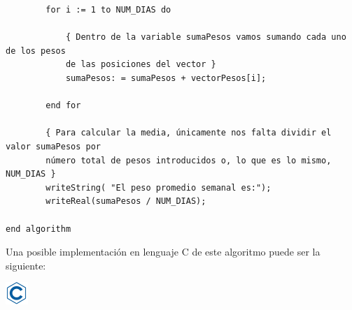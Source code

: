 \documentclass[
]{book}
\begin{document}
\begin{verbatim}
        for i := 1 to NUM_DIAS do

            { Dentro de la variable sumaPesos vamos sumando cada uno de los pesos
            de las posiciones del vector }
            sumaPesos: = sumaPesos + vectorPesos[i];
       
        end for

        { Para calcular la media, únicamente nos falta dividir el valor sumaPesos por
        número total de pesos introducidos o, lo que es lo mismo, NUM_DIAS }
        writeString( "El peso promedio semanal es:");
        writeReal(sumaPesos / NUM_DIAS);

end algorithm
\end{verbatim}

Una posible implementación en lenguaje C de este algoritmo puede ser la siguiente:

\includegraphics{./img/c.png}
\end{document}
